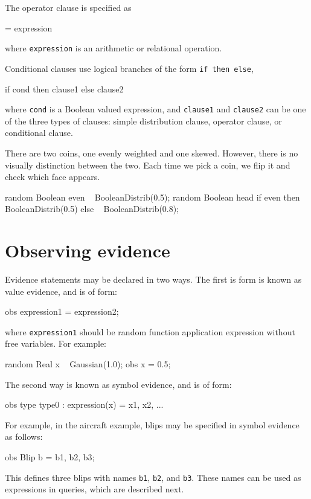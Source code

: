 \documentclass[12pt]{article}
\begin{document}
The operator clause is specified as
\begin{blogcode}
= expression
\end{blogcode}
where \texttt{expression} is an arithmetic or relational operation. 

Conditional clauses use logical branches of the form \texttt{if then else}, 
\begin{blogcode}
if cond then clause1
else clause2
\end{blogcode}
where \texttt{cond} is a Boolean valued expression, and \texttt{clause1} and \texttt{clause2} can be one of the three types of clauses:
simple distribution clause, operator clause, or conditional clause. 

\begin{example}
There are two coins, one evenly weighted and one skewed. However, there is no visually distinction between the two. Each time we pick a coin, we flip it
and check which face appears.
\end{example}
\begin{blogcode}
random Boolean even ~ BooleanDistrib(0.5);
random Boolean head 
  if even then ~ BooleanDistrib(0.5)
  else ~ BooleanDistrib(0.8);
\end{blogcode}

\section{Observing evidence}
Evidence statements may be declared in two ways.  The first is form is known as value evidence, and is of form:
\begin{blogcode}
obs expression1 = expression2;
\end{blogcode}
where \texttt{expression1} should be random function application expression without free variables.  For example:
\begin{blogcode}
random Real x ~ Gaussian(1.0);
obs x = 0.5;
\end{blogcode}

The second way is known as symbol evidence, and is of form:
\begin{blogcode}
obs {type type0 : expression(x)} = { x1, x2, ...}
\end{blogcode}

For example, in the aircraft example, blips may be specified in symbol evidence as follows:
\begin{blogcode}
obs {Blip b} = {b1, b2, b3};
\end{blogcode}
This defines three blips with names \texttt{b1}, \texttt{b2}, and \texttt{b3}.  These names can be used as expressions in queries, which are described next.
\end{document}
